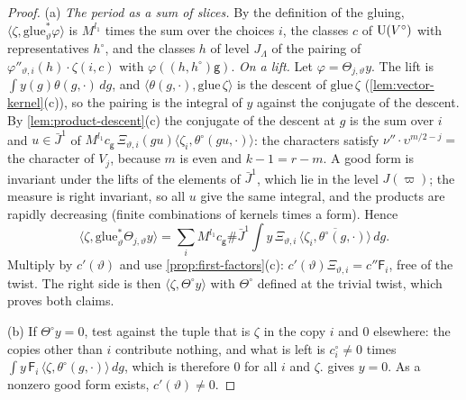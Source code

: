 \begin{proof}
(a) \emph{The period as a sum of slices.} By the definition of the gluing, $\langle\zeta,\mathrm{glue}_\vartheta^*\varphi\rangle$ is $M^{l_1}$ times the sum over the choices $i$, the classes $c$ of $\operatorname{U}(V^\circ)$ with representatives $h^\circ$, and the classes $h$ of level $J_\Lambda$ of the
pairing of $\varphi''_{\vartheta,i}(h)\cdot\zeta(i,c)$ with $\varphi((h,h^\circ)\mathsf g)$. \emph{On a lift.} Let $\varphi=\Theta_{j,\vartheta}y$. The lift is $\int y(g)\theta(g,\cdot)\,dg$, and $\langle\theta(g,\cdot),\mathrm{glue}\,\zeta\rangle$ is the descent of $\mathrm{glue}\,\zeta$ (\cref{lem:vector-kernel}(c)),
so the pairing is the integral of $y$ against the conjugate of the descent. By \cref{lem:product-descent}(c) the conjugate of the descent at $g$ is the sum over $i$ and $u\in\bar J^1$ of $M^{l_1}c_{\mathsf g}\,\Xi_{\vartheta,i}(gu)\langle\zeta_i,\theta^\circ(gu,\cdot)\rangle$: the
characters satisfy $\nu''\cdot\upsilon^{m/2-j}=$ the character of $V_j$, because $m$ is even and $k-1=r-m$. A good form is invariant under the lifts of the elements of $\bar J^1$, which lie in the level $J(\varpi)$; the measure is right
invariant, so all $u$ give the same integral, and the products are rapidly decreasing (finite combinations of kernels times a form). Hence
\[
  \langle\zeta,\mathrm{glue}_\vartheta^*\Theta_{j,\vartheta}y\rangle=\sum_iM^{l_1}c_{\mathsf g}\#\bar J^1\int y\,\Xi_{\vartheta,i}\,\overline{\langle\zeta_i,\theta^\circ(g,\cdot)\rangle}\,dg.
\]
Multiply by $c'(\vartheta)$ and use \cref{prop:first-factors}(c): $c'(\vartheta)\Xi_{\vartheta,i}=c''\mathsf F_i$, free of the twist. The right side is then $\langle\zeta,\Theta^\circ y\rangle$ with $\Theta^\circ$ defined at the trivial twist, which proves both claims.

(b) If $\Theta^\circ y=0$, test against the tuple that is $\zeta$ in the copy $i$ and $0$ elsewhere: the copies other than $i$ contribute nothing, and what is left is $c^\circ_i\ne0$ times $\int y\,\mathsf F_i\,\langle\zeta,\theta^\circ(g,\cdot)\rangle\,dg$, which is therefore $0$ for all
$i$ and $\zeta$.  gives $y=0$. As a nonzero good form exists, $c'(\vartheta)\ne0$.


\end{proof}
